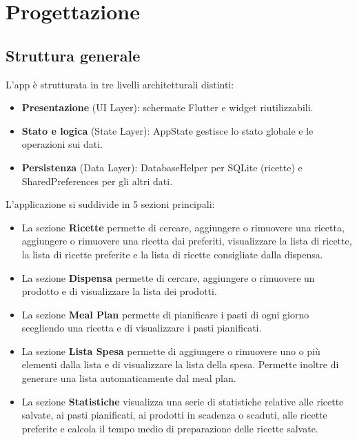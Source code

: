 \documentclass[a4paper, 12pt]{article}
\begin{document}

\section{Progettazione}
\subsection{Struttura generale}
L’app è strutturata in tre livelli architetturali distinti:
\begin{itemize}
    \item \textbf{Presentazione} (UI Layer): schermate Flutter e widget riutilizzabili.
    \item \textbf{Stato e logica} (State Layer): AppState gestisce lo stato globale e le operazioni sui dati.
    \item \textbf{Persistenza} (Data Layer): DatabaseHelper per SQLite (ricette) e SharedPreferences per gli altri dati.
\end{itemize}

\vspace{0.5 cm}
L’applicazione si suddivide in 5 sezioni principali:
\begin{itemize}
    \item La sezione \textbf{Ricette} permette di cercare, aggiungere o rimuovere una ricetta, aggiungere o rimuovere una ricetta dai preferiti, visualizzare la lista di ricette, la lista di ricette preferite e la lista di ricette consigliate dalla dispensa.
    \item La sezione \textbf{Dispensa} permette di cercare, aggiungere o rimuovere un prodotto e di visualizzare la lista dei prodotti.
    \item La sezione \textbf{Meal Plan} permette di pianificare i pasti di ogni giorno scegliendo una ricetta e di visualizzare i pasti pianificati.
    \item La sezione \textbf{Lista Spesa} permette di aggiungere o rimuovere uno o più elementi dalla lista e di visualizzare la lista della spesa. Permette inoltre di generare una lista automaticamente dal meal plan.
    \item La sezione \textbf{Statistiche} visualizza una serie di statistiche relative alle ricette salvate, ai pasti pianificati, ai prodotti in scadenza o scaduti, alle ricette preferite e calcola il tempo medio di preparazione delle ricette salvate.    
\end{itemize}

\end{document}
